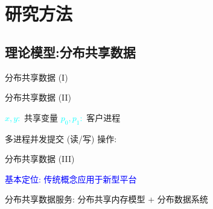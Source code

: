 \section{研究方法}

\subsection{理论模型:分布共享数据}

\begin{frame}{分布共享数据 (I)}
\end{frame}
\begin{frame}{分布共享数据 (II)}
  \begin{center}
    \textcolor{cyan}{$x, y:$} 共享变量 \hspace{0.30cm} \textcolor{cyan}{$p_0, p_1:$} 
    客户进程
  \end{center}

  多进程并发提交 (读/写) 操作:
  

  \begin{center}
  \end{center}

\end{frame}
\begin{frame}{分布共享数据 (III)}
  \begin{center}
    \textcolor{blue}{\large 基本定位: 传统概念应用于新型平台}
  \end{center}

  \vspace{0.20cm}
  \begin{center}
    分布共享数据服务: 分布共享内存模型 + 分布数据系统
  \end{center}
\end{frame}
